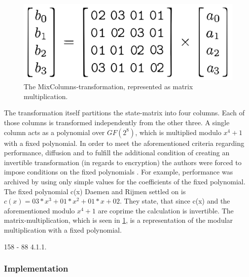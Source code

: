 \begin{figure}
\centering
\includegraphics[scale = 0.2]{data/figures/mixcolumn.png} 
\caption{The MixColumns-transformation, represented as matrix multiplication.}
\label{fig:mixcolumn}
\end{figure}

The transformation itself partitions the
state-matrix into four columns. Each of those columns is transformed
independently from the other three. A single column acts as a polynomial
over $GF(2^{8})$, which is multiplied modulo $x^4 + 1$ with a fixed polynomial. In
order to meet the aforementioned criteria regarding performance,
diffusion and to fulfill the additional condition of creating an
invertible transformation (in regards to encryption) the authors were
forced to impose conditions on the fixed polynomials \cite[p. 39]{rijndael}. For
example, performance was archived by using only simple values for the
coefficients of the fixed polynomial. The fixed polynomial c(x) Daemen
and Rijmen settled on is $c(x) = 03 * x^3 + 01 * x^2 + 01 * x + 02$. They
state, that since c(x) and the aforementioned modulo $x^4+1$ are coprime
the calculation is invertible. The matrix-multiplication, which is seen
in \ref{fig:mixcolumn}, is a representation of the modular multiplication with a
fixed polynomial.

158 - 88 4.1.1. 

\hypertarget{implementation-4}{%
\subsubsection{Implementation}\label{implementation-4}}

